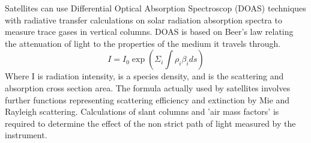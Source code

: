 
Satellites can use  Differential Optical Absorption Spectroscop (DOAS) techniques with radiative transfer calculations on solar radiation absorption spectra to measure trace gases in vertical columns.
DOAS is based on Beer's law relating the attenuation of light to the properties of the medium it travels through. 
$$ I = I_0 \exp \left( \Sigma_i \int \rho_i \beta_i ds \right) $$
Where I is radiation intensity, \rho is a species density, and \beta is the scattering and absorption cross section area.
The formula actually used by satellites involves further functions representing scattering efficiency and extinction by Mie and Rayleigh scattering.
Calculations of slant columns and 'air mass factors' is required to determine the effect of the non strict path of light measured by the instrument.